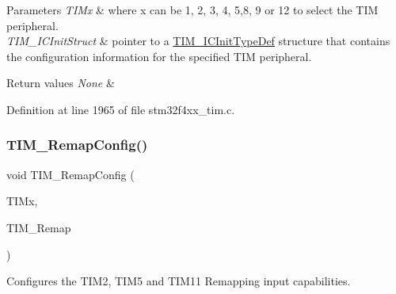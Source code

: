 \begin{DoxyParams}{Parameters}
{\em T\+I\+Mx} & where x can be 1, 2, 3, 4, 5,8, 9 or 12 to select the T\+IM peripheral. \\
\hline
{\em T\+I\+M\+\_\+\+I\+C\+Init\+Struct} & pointer to a \hyperlink{struct_t_i_m___i_c_init_type_def}{T\+I\+M\+\_\+\+I\+C\+Init\+Type\+Def} structure that contains the configuration information for the specified T\+IM peripheral. \\
\hline
\end{DoxyParams}

\begin{DoxyRetVals}{Return values}
{\em None} & \\
\hline
\end{DoxyRetVals}


Definition at line 1965 of file stm32f4xx\+\_\+tim.\+c.

\mbox{\label{group___t_i_m_ga08ffb6f2bfa96b6fbcbb8d8001cb8ba9}} 
\subsubsection{\texorpdfstring{T\+I\+M\+\_\+\+Remap\+Config()}{TIM\_RemapConfig()}}
{\footnotesize\ttfamily void T\+I\+M\+\_\+\+Remap\+Config (\begin{DoxyParamCaption}\item[{\hyperlink{struct_t_i_m___type_def}{T\+I\+M\+\_\+\+Type\+Def} $\ast$}]{T\+I\+Mx,  }\item[{uint16\+\_\+t}]{T\+I\+M\+\_\+\+Remap }\end{DoxyParamCaption})}



Configures the T\+I\+M2, T\+I\+M5 and T\+I\+M11 Remapping input capabilities. 


